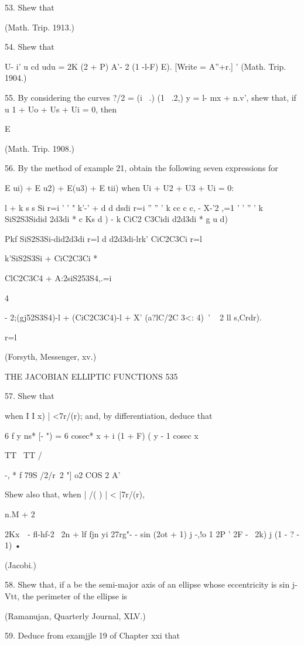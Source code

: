 53. Shew that

(Math. Trip. 1913.)

54. Shew that

U- i' u cd udu = 2K (2 + P) A'- 2 (1 -l-F) E). [Write = A''+r.] '
(Math. Trip. 1904.)

55. By considering the curves ?/2 = (i \ .) (1 \ .2,) y = l- mx +
n.v', shew that, if u 1 + Uo + Us + Ui = 0, then

E %

(Math. Trip. 1908.)

56. By the method of example 21, obtain the following seven
expressions for

E ui) + E u2) + E(u3) + E tii) when Ui + U2 + U3 + Ui = 0:

l + k s s Si r=i ' ' " k'-' + d d dsdi r=i '' '' ' k cc c c, - X-'2
,=1 ' ' '' ' k SiS2S3Sidid 2d3di * c Ks d ) - k CiC2 C3Cidi d2d3di * g
u d)

Pkf SiS2S3Si-did2d3di r=l d d2d3di-lrk' CiC2C3Ci r=l

k'SiS2S3Si + CiC2C3Ci *

ClC2C3C4 + A:2siS253S4,.=i

4

- 2;(gj52S3S4)-l + (CiC2C3C4)-l + X' (a?lC/2C 3<: 4)~' ~ 2 ll s,Crdr).

r=l

(Forsyth, Messenger, xv.)

THE JACOBIAN ELLIPTIC FUNCTIONS 535

57. Shew that

when I I x) | <7r/(r); and, by differentiation, deduce that

6 f y ns* [- ") = 6 cosec* x + i (1 + F) ( y - 1 cosec x

TT \ TT /

 -, * f 79S /2/r\ 2 "] o2 COS 2 A'

Shew also that, when | /( ) | < |7r/(r),

n.M + 2

2Kx\ \ - fl-hf-2 \ 2n + lf fjn yi 27rg"- - sin (2ot + 1) j -,!o 1 2P
' 2F - \ 2k) j (1 - ? - 1) •

(Jacobi.)

58. Shew that, if a be the semi-major axis of an ellipse whose
eccentricity is sin j-Vtt, the perimeter of the ellipse is

(Ramanujan, Quarterly Journal, XLV.)

59. Deduce from examjjle 19 of Chapter xxi that

